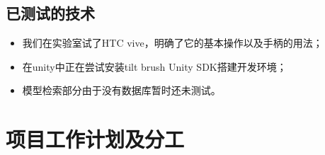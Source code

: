 \documentclass{article}
\begin{document}
 \subsection{已测试的技术}
 
 \begin{itemize}
     \item  我们在实验室试了HTC vive，明确了它的基本操作以及手柄的用法；
     \item  在unity中正在尝试安装tilt brush Unity SDK搭建开发环境；
     \item  模型检索部分由于没有数据库暂时还未测试。
 \end{itemize}

\clearpage

\section{项目工作计划及分工}
\end{document}
